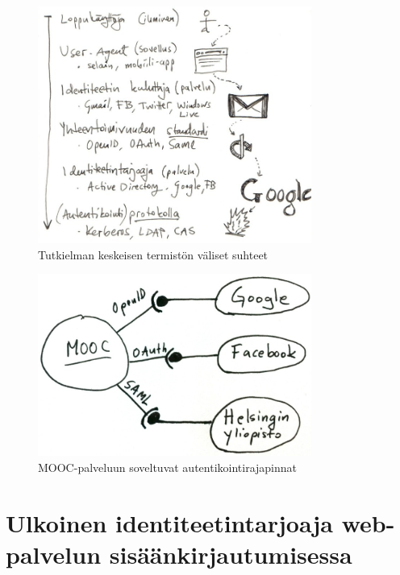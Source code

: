 \documentclass[finnish,gradu]{tktltiki}
\begin{document}
  \begin{figure}[h!]
    \centering
    \includegraphics[width=0.8\textwidth]{images/auth_yleiskuva.jpg}
    \caption{Tutkielman keskeisen termistön väliset suhteet}
    \label{fig:yleiskuva_termien_suhteista}
  \end{figure}

  \begin{figure}
    \centering
    \includegraphics[width=0.8\textwidth]{images/mooc-autentikointirajapinnat.jpg}
    \caption{MOOC-palveluun soveltuvat autentikointirajapinnat}
    \label{fig:mooc-autentikointirajapinnat}
  \end{figure}




\section{Ulkoinen identiteetintarjoaja web-palvelun sisäänkirjautumisessa} %
\label{sec:kakkosluku}
\end{document}
